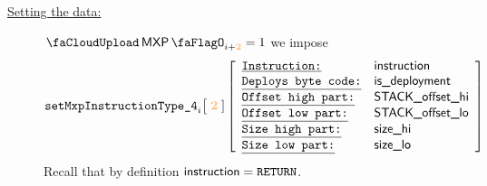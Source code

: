\begin{description}
	\item[\underline{Setting the \mxpMod{} data:}]
		\If $\miscMxpFlag _{i + \locFirstMiscRowOffset} = 1$ \Then we impose
		\[
			\setMxpInstructionTypeFour {i}{\locFirstMiscRowOffset}
			\left[ \begin{array}{ll}
				\utt{Instruction:}       & \locInst     \\
				\utt{Deploys byte code:} & \locDeploys  \\
				\utt{Offset high part:}  & \locOffsetHi \\
				\utt{Offset low  part:}  & \locOffsetLo \\
				\utt{Size high part:}    & \locSizeHi   \\
				\utt{Size low  part:}    & \locSizeLo   \\
			\end{array} \right]
		\]
		\saNote{} Recall that by definition $\textsf{instruction} = \texttt{RETURN}$.


\end{description}
